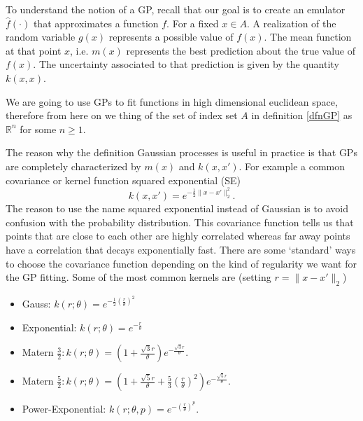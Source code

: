 \documentclass[12pt]{book}
\begin{document}
To understand the notion of a GP, recall that our goal is to create
an emulator $\hat{f}(\cdot)$ that approximates a function $f$. 
For a fixed $x\in A$. A realization of the  random variable $g(x)$ represents
a possible value of $f(x)$. The mean function at that point $x$, i.e. $m(x)$ 
represents the best prediction about the true value of $f(x)$. The uncertainty 
associated to that prediction is given by the quantity $k(x,x)$.

 

We are going to use GPs to fit  functions in  high dimensional euclidean space, therefore from 
here on we thing 
of the set of index set $A$ in definition \ref{dfnGP} as $\mathbb{R}^{n}$ for some $n\geq 1$. 
\newline

The reason why the definition  Gaussian processes is useful in practice is that  GPs are 
completely characterized by $m(x)$ and $k(x,x')$\cite{lifshits2012lectures}. 
 For example a  common covariance or kernel 
function squared exponential (SE)
\begin{equation}\label{eqnsquareexponential}
k(x,x')=e^{-\frac{1}{2}\|x-x'\|_{2}^{2}}.
\end{equation}
The reason to use the name squared exponential instead of Gaussian is to avoid confusion with
the probability distribution.
This  covariance function tells us that points that are close to each other
are highly correlated whereas far away points have a correlation that decays exponentially fast.
There are some `standard' ways to choose the covariance function depending on the kind
of regularity we want for the GP fitting.
Some of the most common kernels are \cite{rasmussen2006gaussian} (setting $r=\|x-x'\|_{2}$)

\begin{itemize}
\item Gauss: $k(r;\theta)=e^{-\frac{1}{2}(\frac{r}{\theta})^{2}}$
\item Exponential: $k(r;\theta)=e^{-\frac{r}{\theta}}$\\
\item Matern $\frac{3}{2}: k(r;\theta)=(1+\frac{\sqrt{3}r}{\theta})e^{-\frac{\sqrt{3}r}{\theta}}$.
\item Matern $\frac{5}{2}: k(r;\theta)=(1+\frac{\sqrt{5}r}{\theta}+\frac{5}{3}
(\frac{r}{\theta})^{2})e^{-\frac{\sqrt{5}r}{\theta}}$.
\item Power-Exponential: $k(r;\theta,p)=e^{-(\frac{r}{\theta})^{p}}$.
\end{itemize}
\end{document}
